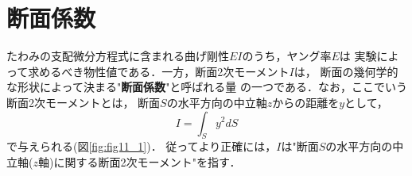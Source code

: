 \documentclass[10pt,a4j]{jbook}
\newlength{\minitwocolumn}
\begin{document}
\newcommand{\fat}[1]{\mbox{\boldmath $#1$}}
\newcommand{\D}{\partial}
\newcommand{\w}{\omega}
\newcommand{\ga}{\alpha}
\newcommand{\gb}{\beta}
\newcommand{\gx}{\xi}
\newcommand{\gz}{\zeta}
\newcommand{\vhat}[1]{\hat{\fat{#1}}}
\newcommand{\spc}{\vspace{0.7\baselineskip}}
\newcommand{\halfspc}{\vspace{0.3\baselineskip}}

\newcommand{\twofig}[2]
 {
   \begin{figure}
     \begin{minipage}[t]{\minitwocolumn}
         \begin{center}   #1
         \end{center}
     \end{minipage}
         \hspace{\columnsep}
     \begin{minipage}[t]{\minitwocolumn}
         \begin{center} #2
         \end{center}
     \end{minipage}
   \end{figure}
 }
\setcounter{chapter}{7}
\chapter{断面係数}
たわみの支配微分方程式に含まれる曲げ剛性$EI$のうち，ヤング率$E$は
実験によって求めるべき物性値である．一方，断面2次モーメント$I$は，
断面の幾何学的な形状によって決まる"{\bf 断面係数}"と呼ばれる量
の一つである．なお，ここでいう断面2次モーメントとは，
断面$S$の水平方向の中立軸$z$からの距離を$y$として，
\begin{equation}
	I=\int_S y^2 dS
	\label{eqn:Iz_xy}
\end{equation}
で与えられる(図\ref{fig:fig11_1})．
従ってより正確には，$I$は"断面$S$の水平方向の中立軸($z$軸)に関する断面2次モーメント"を指す．
\end{document}

